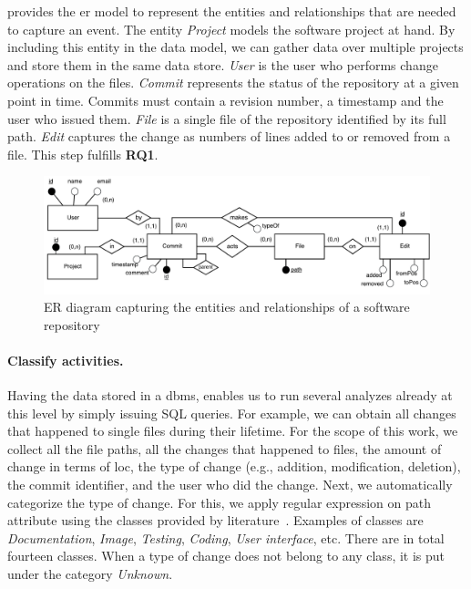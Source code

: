  provides the \gls{er} model to represent the entities and relationships that are needed to capture an event. The entity \textsl{Project} models the software project at hand. By including this entity in the data model, we can gather data over multiple projects and store them in the same data store. \textsl{User} is the user who performs change operations on the files. \textsl{Commit} represents the status of the repository at a given point in time. Commits must contain a revision number, a timestamp and the user who issued them. \textsl{File} is a single file of the repository identified by its full path. \textsl{Edit} captures the change as numbers of lines added to or removed from a file. This step fulfills \textbf{RQ1}.

\begin{figure}[]
    \centering
    \includegraphics[width=\textwidth]{figures/CommitLogER}
    \caption{ER diagram capturing the entities and relationships of a software repository}
    \label{fig:er-diagram}
\end{figure}


\paragraph{Classify activities.}


Having the data stored in a \gls{dbms}, enables us to run several analyzes already at this level by simply issuing SQL queries. For example, we can obtain all changes that happened to single files during their lifetime. For the scope of this work, we collect all the file paths, all the changes that happened to files, the amount of change in terms of \gls{loc}, the type of change (e.g., addition, modification, deletion), the commit identifier, and the user who did the change. 
Next, we automatically categorize the type of change. For this, we apply regular expression on path attribute using the classes provided by literature~\cite{DBLP:journals/ese/VasilescuSGM14}. 
Examples of classes are  \textsl{Documentation}, \textsl{Image}, \textsl{Testing}, \textsl{Coding}, \textsl{User interface}, etc. There are in total fourteen classes. When a type of change does not belong to any class, it is put under the category \textsl{Unknown}.

